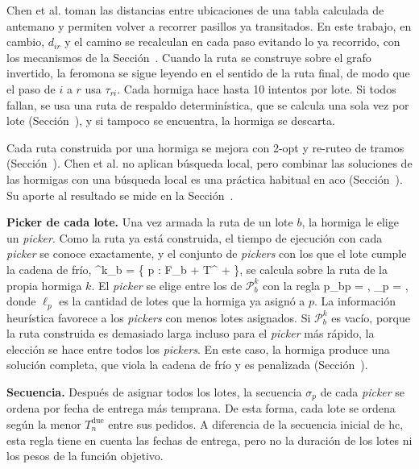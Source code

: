 Chen et al. toman las distancias entre ubicaciones de una tabla calculada de
antemano y permiten volver a recorrer pasillos ya transitados. En este
trabajo, en cambio, $d_{ir}$ y el camino se recalculan en cada paso evitando
lo ya recorrido, con los mecanismos de la Sección~. Cuando
la ruta se construye sobre el grafo invertido, la feromona se sigue leyendo
en el sentido de la ruta final, de modo que el paso de $i$ a $r$ usa
$\tau_{ri}$. Cada hormiga hace hasta 10 intentos por lote. Si todos fallan,
se usa una ruta de respaldo determinística, que se calcula una sola vez por
lote (Sección~), y si tampoco se encuentra, la
hormiga se descarta.

Cada ruta construida por una hormiga se mejora con 2-opt y re-ruteo de
tramos (Sección~). Chen et al. no aplican búsqueda local, pero combinar las soluciones de las hormigas con una
búsqueda local es una práctica habitual en \ac{aco} (Sección~). Su
aporte al resultado se mide en la Sección~.

{\bf Picker de cada lote.} Una vez armada la ruta de un lote $b$, la
hormiga le elige un {\em picker}. Como la ruta ya está construida, el
tiempo de ejecución con cada {\em picker} se conoce exactamente, y el
conjunto de {\em pickers} con los que el lote cumple la cadena de frío,
\startformula
	^k_b = \left\{ p \in {} : F_b +  \leq T^{} + \varepsilon \right\},
\stopformula
se calcula sobre la ruta de la propia hormiga $k$. El {\em picker} se elige entre los de $\mathcal{P}^k_b$ con
la regla
\startplaceformula[reference=eq:aco_regla_picker]
\startformula
	p_{bp} = ,
	\qquad \eta_p = ,
\stopformula
\stopplaceformula
donde $\ell_p$ es la cantidad de lotes que la hormiga ya asignó a $p$. La
información heurística favorece a los {\em pickers} con menos lotes asignados.
Si $\mathcal{P}^k_b$ es vacío, porque la ruta construida es demasiado larga incluso para el
{\em picker} más rápido, la elección se hace entre todos los {\em pickers}.
En este caso, la hormiga produce una solución completa, que viola la cadena de
frío y es penalizada (Sección~).

{\bf Secuencia.} Después de asignar todos los lotes, la secuencia
$\sigma_p$ de cada {\em picker} se ordena por fecha de entrega más
temprana. De esta forma, cada lote se ordena según la menor $T^{\text{due}}_n$ entre sus
pedidos. A diferencia de la secuencia inicial de \ac{hc}, esta regla tiene
en cuenta las fechas de entrega, pero no la duración de los lotes ni los pesos de la función objetivo.

